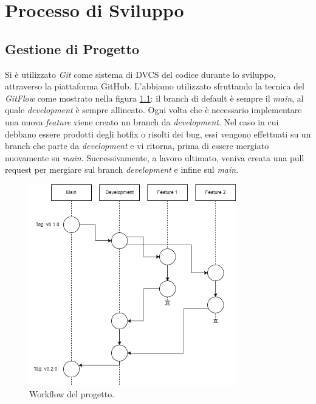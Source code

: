 \chapter{Processo di Sviluppo}

\section{Gestione di Progetto}
Si è utilizzato \textit{Git} come sistema di DVCS del codice durante lo sviluppo, attraverso la piattaforma GitHub. L'abbiamo utilizzato sfruttando la tecnica del \textit{GitFlow} come mostrato nella figura \ref{pic:workflow}: il branch di default è sempre il \textit{main}, al quale \textit{development} è sempre allineato. Ogni volta che è necessario implementare una nuova \textit{feature} viene creato un branch da \textit{development}. Nel caso in cui debbano essere prodotti degli hotfix o risolti dei bug, essi vengono effettuati su un branch che parte da \textit{development} e vi ritorna, prima di essere mergiato nuovamente su \textit{main}. Successivamente, a lavoro ultimato, veniva creata una pull request per mergiare sul branch \textit{development} e infine sul \textit{main}.

\begin{figure}[ht]
    \includegraphics[width=9cm]{Images/gitWorkflow.png}
    \centering
    \caption{\label{pic:workflow}Workflow del progetto.}
\end{figure}

